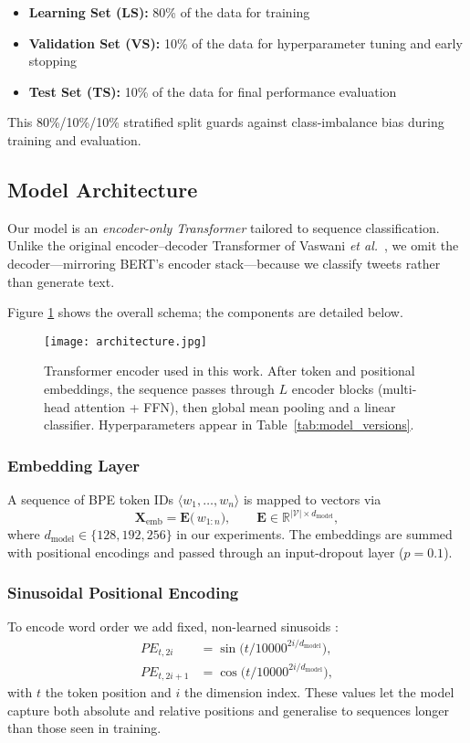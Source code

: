 \documentclass[twocolumn,superscriptaddress,aps]{revtex4-1}
\begin{document}
\begin{itemize}
  \item \textbf{Learning Set (LS):} 80\% of the data for training  
  \item \textbf{Validation Set (VS):} 10\% of the data for hyperparameter tuning and early stopping  
  \item \textbf{Test Set (TS):} 10\% of the data for final performance evaluation  
\end{itemize}

This 80\%/10\%/10\% stratified split guards against class-imbalance bias during training and evaluation.

\subsection{Model Architecture}
\label{subsec:architecture}

Our model is an \emph{encoder-only Transformer} tailored to sequence classification.  
Unlike the original encoder–decoder Transformer of Vaswani \textit{et al.}~\cite{vaswani2017attention}, we omit the decoder—mirroring BERT’s encoder stack—because we classify tweets rather than generate text.

Figure \ref{architecture} shows the overall schema; the components are detailed below.

\begin{figure}[t]
    \centering
    \texttt{[image: architecture.jpg]}
    \caption{Transformer encoder used in this work. After token and positional embeddings, the sequence passes through $L$ encoder blocks (multi-head attention + FFN), then global mean pooling and a linear classifier. Hyperparameters appear in Table~\ref{tab:model_versions}.}
    \label{architecture}
\end{figure}

\subsubsection{Embedding Layer}
A sequence of BPE token IDs $\langle w_{1},\dots,w_{n}\rangle$ is mapped to vectors via
\[
  \mathbf{X}_{\text{emb}} = \mathbf{E}\bigl(\,w_{1:n}\bigr),
  \qquad \mathbf{E}\in\mathbb{R}^{|\mathcal{V}|\times d_{\text{model}}},
\]
where $d_{\text{model}}\!\in\!\{128,192,256\}$ in our experiments.  
The embeddings are summed with positional encodings and passed through an input-dropout layer ($p{=}0.1$).

\subsubsection{Sinusoidal Positional Encoding}
To encode word order we add fixed, non-learned sinusoids \cite{vaswani2017attention}:
\[
\begin{aligned}
PE_{t,2i}   &= \sin\!\bigl(t / 10000^{2i / d_{\text{model}}}\bigr),\\
PE_{t,2i+1} &= \cos\!\bigl(t / 10000^{2i / d_{\text{model}}}\bigr),
\end{aligned}
\]
with $t$ the token position and $i$ the dimension index.  These values let the model capture both absolute and relative positions and generalise to sequences longer than those seen in training.
\end{document}
